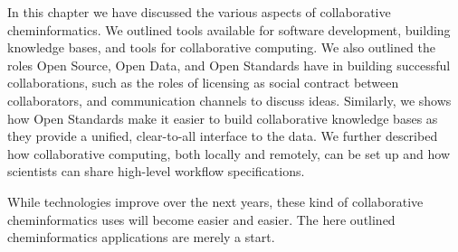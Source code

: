 \documentclass[11pt]{book}
\begin{document}
In this chapter we have discussed the various aspects of collaborative
cheminformatics. We outlined tools available for software development,
building knowledge bases, and tools for collaborative computing.
We also outlined the roles Open Source, Open Data, and Open Standards
have in building successful collaborations, such as the roles of
licensing as social contract between collaborators, and communication
channels to discuss ideas. Similarly, we shows how Open Standards
make it easier to build collaborative knowledge bases as they
provide a unified, clear-to-all interface to the data. We further
described how collaborative computing, both locally and
remotely, can be set up and how scientists can share high-level
workflow specifications.

While technologies improve over the next years, these kind of
collaborative cheminformatics uses will become easier and easier.
The here outlined cheminformatics applications are merely a start.



\end{document}

